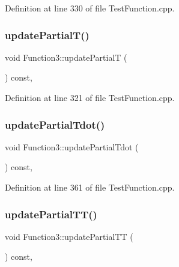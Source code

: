 Definition at line 330 of file Test\+Function.\+cpp.

\hypertarget{classFunction3_a6592fadecc793ba578475ed791c657e7}{}\label{classFunction3_a6592fadecc793ba578475ed791c657e7} 
\subsubsection{\texorpdfstring{update\+Partial\+T()}{updatePartialT()}}
{\footnotesize\ttfamily void Function3\+::update\+PartialT (\begin{DoxyParamCaption}{ }\end{DoxyParamCaption}) const\hspace{0.3cm}{\ttfamily [inline]}, {\ttfamily [protected]}}



Definition at line 321 of file Test\+Function.\+cpp.

\hypertarget{classFunction3_af8933a1d41481c599995d64519a69a33}{}\label{classFunction3_af8933a1d41481c599995d64519a69a33} 
\subsubsection{\texorpdfstring{update\+Partial\+Tdot()}{updatePartialTdot()}}
{\footnotesize\ttfamily void Function3\+::update\+Partial\+Tdot (\begin{DoxyParamCaption}{ }\end{DoxyParamCaption}) const\hspace{0.3cm}{\ttfamily [inline]}, {\ttfamily [protected]}}



Definition at line 361 of file Test\+Function.\+cpp.

\hypertarget{classFunction3_a0e88a8fab26e4eb4fd30e6dd27c5a1b2}{}\label{classFunction3_a0e88a8fab26e4eb4fd30e6dd27c5a1b2} 
\subsubsection{\texorpdfstring{update\+Partial\+T\+T()}{updatePartialTT()}}
{\footnotesize\ttfamily void Function3\+::update\+Partial\+TT (\begin{DoxyParamCaption}{ }\end{DoxyParamCaption}) const\hspace{0.3cm}{\ttfamily [inline]}, {\ttfamily [protected]}}



